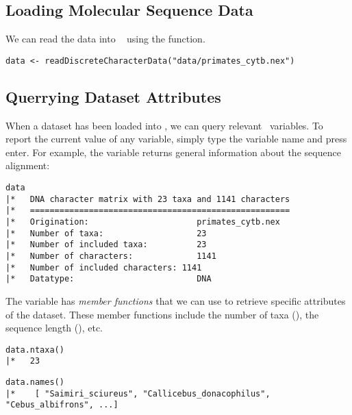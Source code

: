 \subsection{Loading Molecular Sequence Data}
We can read the data into \RevBayes~ using the  function. 
{\tt \begin{snugshade*}
\begin{lstlisting}
data <- readDiscreteCharacterData("data/primates_cytb.nex")
\end{lstlisting}
\end{snugshade*}}

\subsection{Querrying Dataset Attributes}
When a dataset has been loaded into \RevBayes, we can query relevant \Rev~variables. 
To report the current value of any variable, simply type the variable name and press enter. 
For example, the  variable returns general information about the sequence alignment:
{\tt \begin{snugshade*}
\begin{lstlisting}
data
|*   DNA character matrix with 23 taxa and 1141 characters
|*   =====================================================
|*   Origination:                      primates_cytb.nex
|*   Number of taxa:                   23
|*   Number of included taxa:          23
|*   Number of characters:             1141
|*   Number of included characters: 1141
|*   Datatype:                         DNA
\end{lstlisting}
\end{snugshade*}}

The  variable has \textit{member functions} that we can use to retrieve specific attributes of the dataset. 
These member functions include the number of taxa (), the sequence length (), etc.
{\tt \begin{snugshade*}
\begin{lstlisting}
data.ntaxa()
|*   23
\end{lstlisting}
\end{snugshade*}}

{\tt \begin{snugshade*}
\begin{lstlisting}
data.names()	
|*    [ "Saimiri_sciureus", "Callicebus_donacophilus", "Cebus_albifrons", ...]
\end{lstlisting}
\end{snugshade*}}



